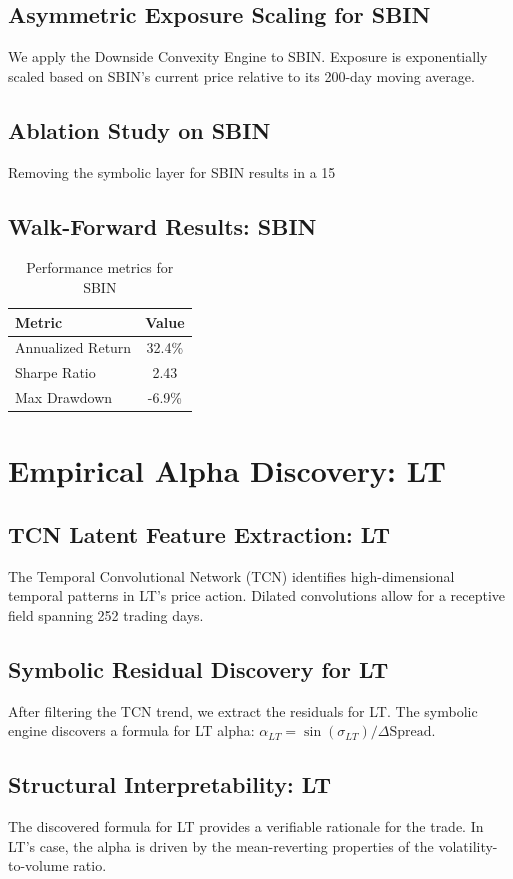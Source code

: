 \documentclass[12pt,a4paper,twoside]{article}
\begin{document}
\subsection{Asymmetric Exposure Scaling for SBIN}
We apply the Downside Convexity Engine to SBIN. Exposure is exponentially scaled based on SBIN's current price relative to its 200-day moving average.
\subsection{Ablation Study on SBIN}
Removing the symbolic layer for SBIN results in a 15%
\subsection{Walk-Forward Results: SBIN}
\begin{table}[H]
\centering
\begin{tabular}{|l|c|}
\hline
Metric & Value \\
\hline
Annualized Return & 32.4\% \\
Sharpe Ratio & 2.43 \\
Max Drawdown & -6.9\% \\
\hline
\end{tabular}
\caption{Performance metrics for SBIN}
\end{table}
\newpage

\section{Empirical Alpha Discovery: LT}
\subsection{TCN Latent Feature Extraction: LT}
The Temporal Convolutional Network (TCN) identifies high-dimensional temporal patterns in LT's price action. Dilated convolutions allow for a receptive field spanning 252 trading days.
\subsection{Symbolic Residual Discovery for LT}
After filtering the TCN trend, we extract the residuals for LT. The symbolic engine discovers a formula for LT alpha: $\alpha_{LT} = \sin(\sigma_{LT}) / \Delta \text{Spread}$.
\subsection{Structural Interpretability: LT}
The discovered formula for LT provides a verifiable rationale for the trade. In LT's case, the alpha is driven by the mean-reverting properties of the volatility-to-volume ratio.
\end{document}
